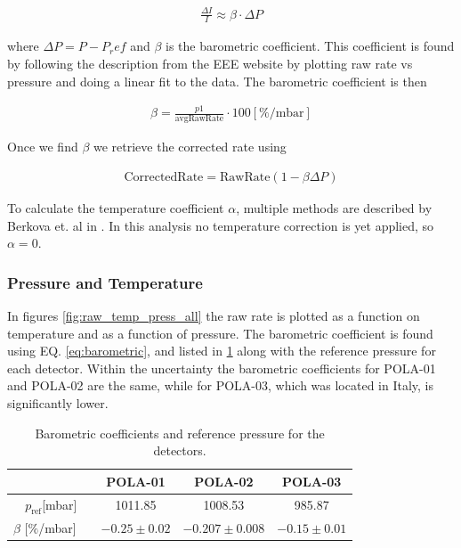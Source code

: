 \documentclass[prX, twocolumn, a4paper]{revtex4}
\begin{document}
\begin{align}
    \frac{\Delta I}{I} \approx \beta \cdot \Delta P
\end{align}

where $\Delta P = P-P_ref$ and $\beta$ is the barometric coefficient. This coefficient is found by following the description from the EEE website \cite{EEEwebsite} by plotting raw rate vs pressure and doing a linear fit to the data. The barometric coefficient is then

\begin{align}
    \beta = \frac{p1}{\text{avgRawRate}} \cdot 100 [\%/\text{mbar}]
    \label{eq:barometric}
\end{align}

Once we find $\beta$ we retrieve the corrected rate using

\begin{align}
    \text{CorrectedRate} = \text{RawRate}(1-\beta\Delta P)
    \label{eq:corrected_raw}
\end{align}

To calculate the temperature coefficient $\alpha$, multiple methods are described by Berkova et. al in \cite{astra-8-41-2012}. In this analysis no temperature correction is yet applied, so $\alpha = 0$. 

\subsubsection{Pressure and Temperature}

In figures \ref{fig:raw_temp_press_all} the raw rate is plotted as a function on temperature and as a function of pressure. The barometric coefficient is found using EQ. \ref{eq:barometric}, and listed in \ref{tab:barometric} along with the reference pressure for each detector. Within the uncertainty the barometric coefficients for POLA-01 and POLA-02 are the same, while for POLA-03, which was located in Italy, is significantly lower.

\begin{table}
    \centering
    \caption{Barometric coefficients and reference pressure for the detectors.}
    \begin{tabular}{c | c | c | c }
         & POLA-01 & POLA-02 & POLA-03  \\
        \hline
        $p_{\text{ref}}$[mbar] & 1011.85 & 1008.53 & 985.87 \\
        $\beta$ [$\%$/mbar]$\quad$ & $-0.25\pm0.02$ & $-0.207\pm0.008$ & $-0.15\pm 0.01$\\
        \hline
    \end{tabular}
    \label{tab:barometric}
\end{table}
\end{document}
